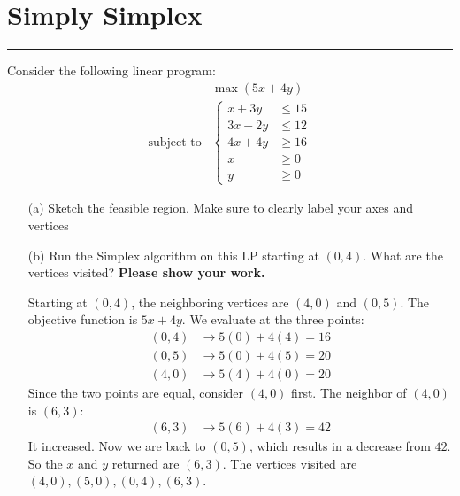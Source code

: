 \documentclass{article}
\begin{document}
\newpage
\section*{Simply Simplex}
\hrule

Consider the following linear program:
    \begin{align*}
                          &\max(5x + 4y)  \\
        \text{subject to} &\begin{cases}
            x + 3y &\leq 15 \\
            3x - 2y &\leq 12 \\
            4x + 4y &\geq 16 \\
            x &\geq 0 \\
            y &\geq 0   
        \end{cases}    
    \end{align*}
    \begin{itemize}
        \item [(a)] Sketch the feasible region. Make sure to clearly label your axes and vertices
            \begin{answer}
                \begin{fixedfigure}
                \end{fixedfigure}

            \end{answer}

        \item [(b)] Run the Simplex algorithm on this LP starting at $(0, 4)$. What are the vertices visited? \textbf{Please show your work.}
            \begin{answer}
                Starting at $(0, 4)$, the neighboring vertices are $(4, 0)$ and $(0, 5)$. The objective function is $5x + 4y$. We evaluate at the three points:
                    \begin{align*}
                        (0, 4) &\rightarrow 5(0) + 4(4) = 16 \\
                        (0, 5) &\rightarrow 5(0) + 4(5) = 20 \\
                        (4, 0) &\rightarrow 5(4) + 4(0) = 20   
                    \end{align*}
                Since the two points are equal, consider $(4, 0)$ first. The neighbor of $(4, 0)$ is $(6, 3)$:
                    \begin{align*}
                        (6, 3) &\rightarrow 5(6) + 4(3) = 42   
                    \end{align*}
                It increased. Now we are back to $(0, 5)$, which results in a decrease from $42$. So the $x$ and $y$ returned are $(6, 3)$. The vertices visited are $(4, 0), (5, 0), (0, 4), (6, 3)$.
            \end{answer}
    \end{itemize}
\end{document}
